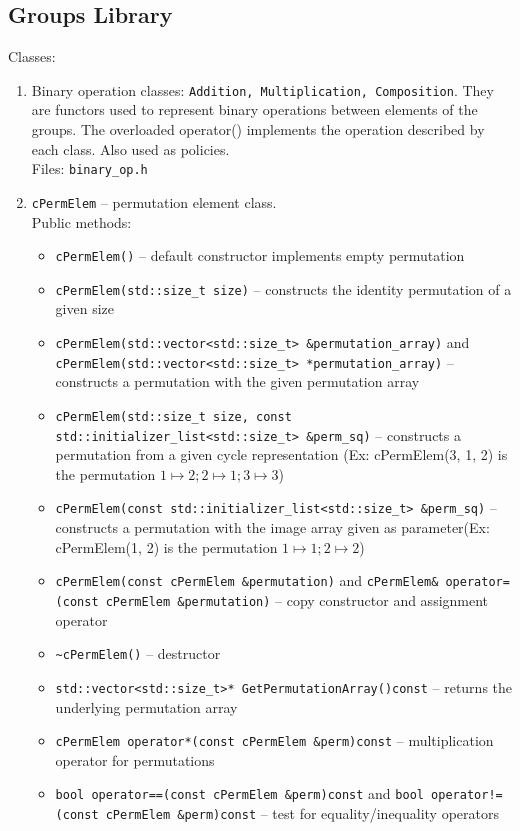 \documentclass[a4paper,11pt]{article}
\begin{document}
\subsection{Groups Library}
Classes:\\
\begin{enumerate}
\item
Binary operation classes: \verb=Addition, Multiplication, Composition=. They are functors used to represent binary operations between elements of the groups. The overloaded operator() implements the operation described by each class. Also used as policies.\\
Files: \verb=binary_op.h=
\item
\verb=cPermElem= -- permutation element class.\\
Public methods:
\begin{itemize}
\item
\verb=cPermElem()= -- default constructor implements empty permutation
\item
\verb=cPermElem(std::size_t size)= -- constructs the identity permutation of a given size
\item
\verb=cPermElem(std::vector<std::size_t> &permutation_array)= and \verb=cPermElem(std::vector<std::size_t> *permutation_array)= -- constructs a permutation with the given permutation array
\item
\verb=cPermElem(std::size_t size, const std::initializer_list<std::size_t> &perm_sq)= -- constructs a permutation from a given cycle representation (Ex: cPermElem(3, {1, 2}) is the permutation $1\mapsto2;2\mapsto1;3\mapsto3$)
\item
\verb=cPermElem(const std::initializer_list<std::size_t> &perm_sq)= -- constructs a permutation with the image array given as parameter(Ex: cPermElem({1, 2}) is the permutation $1\mapsto1;2\mapsto2$)
\item
\verb=cPermElem(const cPermElem &permutation)= and \verb+cPermElem& operator=(const cPermElem &permutation)+ -- copy constructor and assignment operator
\item
\verb=~cPermElem()= -- destructor
\item
\verb=std::vector<std::size_t>* GetPermutationArray()const= -- returns the underlying permutation array
\item
\verb=cPermElem operator*(const cPermElem &perm)const= -- multiplication operator for permutations
\item
\verb+bool operator==(const cPermElem &perm)const+ and \verb+bool operator!=(const cPermElem &perm)const+ -- test for equality/inequality operators

\end{itemize}
\end{enumerate}
\end{document}
